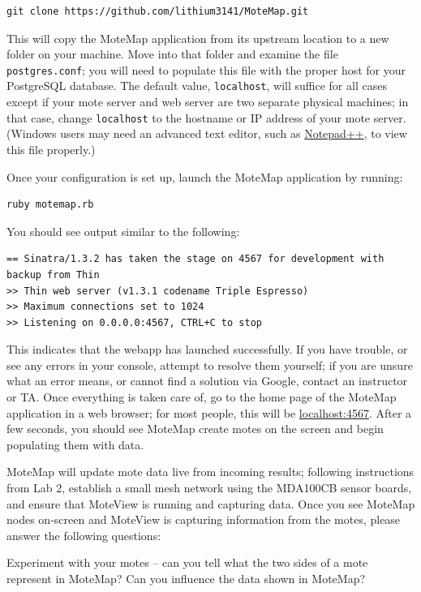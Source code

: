 \documentclass{article}
\begin{document}
\begin{verbatim}
git clone https://github.com/lithium3141/MoteMap.git
\end{verbatim}

This will copy the MoteMap application from its upstream location to a new folder on your machine. Move into that folder and examine the file \verb!postgres.conf!; you will need to populate this file with the proper host for your PostgreSQL database. The default value, \verb!localhost!, will suffice for all cases except if your mote server and web server are two separate physical machines; in that case, change \verb!localhost! to the hostname or IP address of your mote server. (Windows users may need an advanced text editor, such as \href{http://notepad-plus-plus.org/}{Notepad++}, to view this file properly.)

Once your configuration is set up, launch the MoteMap application by running:

\begin{verbatim}
ruby motemap.rb
\end{verbatim}

You should see output similar to the following:

\begin{verbatim}
== Sinatra/1.3.2 has taken the stage on 4567 for development with backup from Thin
>> Thin web server (v1.3.1 codename Triple Espresso)
>> Maximum connections set to 1024
>> Listening on 0.0.0.0:4567, CTRL+C to stop
\end{verbatim}

This indicates that the webapp has launched successfully. If you have trouble, or see any errors in your console, attempt to resolve them yourself; if you are unsure what an error means, or cannot find a solution via Google, contact an instructor or TA. Once everything is taken care of, go to the home page of the MoteMap application in a web browser; for most people, this will be \href{http://localhost:4567}{localhost:4567}. After a few seconds, you should see MoteMap create motes on the screen and begin populating them with data.

MoteMap will update mote data live from incoming results; following instructions from Lab 2, establish a small mesh network using the MDA100CB sensor boards, and ensure that MoteView is running and capturing data. Once you see MoteMap nodes on-screen and MoteView is capturing information from the motes, please answer the following questions:

 Experiment with your motes -- can you tell what the two sides of a mote represent in MoteMap? Can you influence the data shown in MoteMap?
\end{document}
